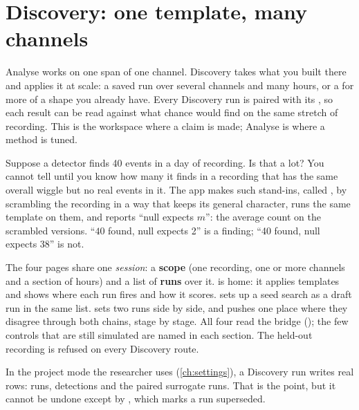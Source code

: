 \chapter{Discovery: one template, many channels}\label{ch:discovery}
Analyse works on one span of one channel. Discovery takes what you built there and applies it at
scale: a saved  run over several channels and many hours, or a
 for more of a shape you already have. Every Discovery run is
paired with its , so each result can be read against what chance would find on
the same stretch of recording. This is the workspace where a claim is made; Analyse is where a
method is tuned.

\begin{plainterms}
Suppose a detector finds 40 events in a day of recording. Is that a lot? You cannot tell until you
know how many it finds in a recording that has the same overall wiggle but no real events in it.
The app makes such stand-ins, called , by scrambling the recording in a
way that keeps its general character, runs the same template on them, and reports ``null expects
\(m\)'': the average count on the scrambled versions. ``\(40\) found, null expects 2'' is a finding;
``40 found, null expects 38'' is not.
\end{plainterms}

The four pages share one \emph{session}: a \textbf{scope} (one recording, one or more channels and a
section of hours) and a list of \textbf{runs} over it.  is home: it applies
templates and shows where each run fires and how it scores.  sets up a seed
search as a draft run in the same list.  sets two runs side by side, and
 pushes one place where they disagree through both chains, stage by stage.
All four read the bridge (); the few controls that are still simulated are named
in each section. The held-out recording is refused on every Discovery route.

\begin{watchout}
In the project mode the researcher uses (\cref{ch:settings}), a Discovery run writes real rows:
runs, detections and the paired surrogate runs. That is the point, but it cannot be undone except
by , which marks a run superseded.
\end{watchout}

